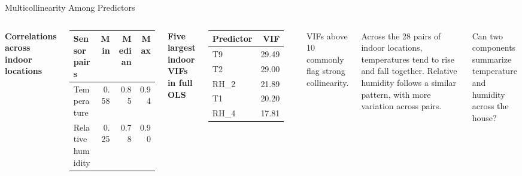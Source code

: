 \documentclass[aspectratio=169,11pt]{beamer}
\begin{document}
\begin{frame}{Multicollinearity Among Predictors}
    \begin{columns}[c,onlytextwidth]
            \centering\small
            \textbf{Correlations across indoor locations}\par\smallskip
            \begin{tabular}{@{}lrrr@{}}
                \toprule
                Sensor pairs & Min & Median & Max \\
                \midrule
                Temperature & 0.58 & 0.85 & 0.94 \\
                Relative humidity & 0.25 & 0.78 & 0.90 \\
                \bottomrule
            \end{tabular}\par\medskip
            \textbf{Five largest indoor VIFs in full OLS}\par\smallskip
            \begin{tabular}{@{}lr@{}}
                \toprule
                Predictor & VIF \\
                \midrule
                T9 & 29.49 \\
                T2 & 29.00 \\
                RH\_2 & 21.89 \\
                T1 & 20.20 \\
                RH\_4 & 17.81 \\
                \bottomrule
            \end{tabular}\par\smallskip
            {\scriptsize VIFs above 10 commonly flag strong collinearity.\par}
            \small
            Across the 28 pairs of indoor locations, temperatures tend
            to rise and fall together. Relative humidity follows a similar
            pattern, with more variation across pairs.

            \medskip
            Can two components summarize temperature and humidity
            across the house?
    \end{columns}
\end{frame}
\end{document}
